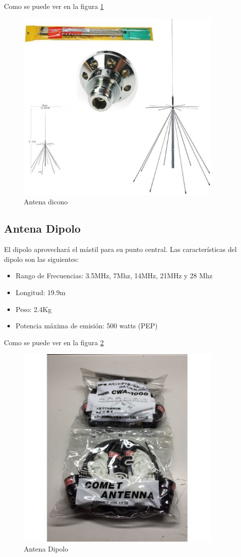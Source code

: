 \documentclass[letterpaper, 10pt]{article} %
\begin{document}
Como se puede ver en la figura \ref{fig:antena}

\begin{figure}[h!]
	\centering
	\includegraphics[width=10cm]{img/diamond_d3000.pdf}
	\caption{Antena dicono}
	\label{fig:antena}
\end{figure}

\subsection{Antena Dipolo}
El dipolo aprovechará el mástil para su punto central. Las características del dipolo son las siguientes:
\begin{itemize}
	\item Rango de Frecuencias: 3.5MHz, 7Mhz, 14MHz, 21MHz y 28 Mhz
	\item Longitud: 19.9m
	\item Peso: 2.4Kg
	\item Potencia máxima de emisión: 500 watts (PEP)
\end{itemize}

Como se puede ver en la figura \ref{fig:dipolo}

\begin{figure}[h!]
	\centering
	\includegraphics[width=10cm]{img/cwa-1000.pdf}
	\caption{Antena Dipolo}
	\label{fig:dipolo}
\end{figure}
\end{document}
